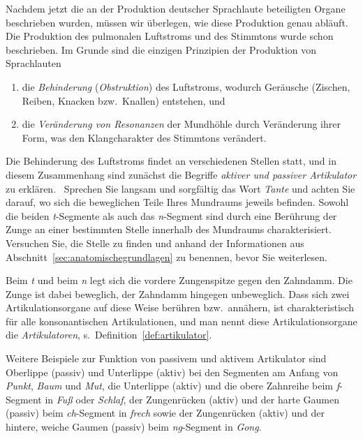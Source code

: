 \label{sec:passiveraktiverartikulator}

Nachdem jetzt die an der Produktion deutscher Sprachlaute beteiligten Organe beschrieben wurden, müssen wir überlegen, wie diese Produktion genau abläuft.
Die Produktion des pulmonalen Luftstroms und des Stimmtons wurde schon beschrieben.
Im Grunde sind die einzigen Prinzipien der Produktion von Sprachlauten

\begin{enumerate}\Lf
  \item die \textit{Behinderung} (\textit{Obstruktion}) des Luftstroms, wodurch Geräusche (Zischen, Reiben, Knacken bzw.\ Knallen) entstehen, und
  \item die \textit{Veränderung von Resonanzen} der Mundhöhle durch Veränderung ihrer Form, was den Klangcharakter des Stimmtons verändert.
\end{enumerate}

Die Behinderung des Luftstroms findet an verschiedenen Stellen statt, und in diesem Zusammenhang sind zunächst die Begriffe \textit{aktiver und passiver Artikulator} zu erklären.
\TuBegin~Sprechen Sie langsam und sorgfältig das Wort \textit{Tante} und achten Sie darauf, wo sich die beweglichen Teile Ihres Mundraums jeweils befinden.
Sowohl die beiden \textit{t}-Segmente als auch das \textit{n}-Segment sind durch eine Berührung der Zunge an einer bestimmten Stelle innerhalb des Mundraums charakterisiert.
Versuchen Sie, die Stelle zu finden und anhand der Informationen aus Abschnitt~\ref{sec:anatomischegrundlagen} zu benennen, bevor Sie weiterlesen.

Beim \textit{t} und beim \textit{n} legt sich die vordere Zungenspitze gegen den Zahndamm.
Die Zunge ist dabei beweglich, der Zahndamm hingegen unbeweglich.
Dass sich zwei Artikulationsorgane auf diese Weise berühren bzw.\ annähern, ist charakteristisch für alle konsonantischen Artikulationen, und man nennt diese Artikulationsorgane die \textit{Artikulatoren}, s.\ Definition~\ref{def:artikulator}.


Weitere Beispiele zur Funktion von passivem und aktivem Artikulator sind Oberlippe (passiv) und Unterlippe (aktiv) bei den Segmenten am Anfang von \textit{Punkt}, \textit{Baum} und \textit{Mut}, die Unterlippe (aktiv) und die obere Zahnreihe beim \textit{f}-Segment in \textit{Fuß} oder \textit{Schlaf}, der Zungenrücken (aktiv) und der harte Gaumen (passiv) beim \textit{ch}-Segment in \textit{frech} sowie der Zungenrücken (aktiv) und der hintere, weiche Gaumen (passiv) beim \textit{ng}-Segment in \textit{Gong}.

